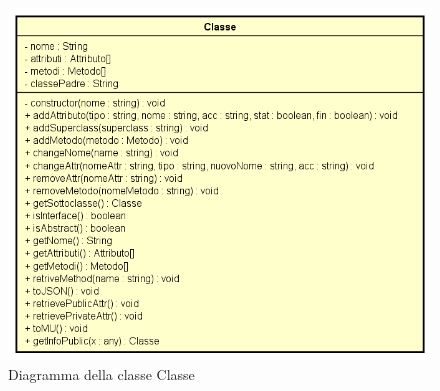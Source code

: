 \begin{figure}[h!]
	\centering
	\includegraphics[scale=0.8]{res/sections/SpecificaFrontEnd/Services/Disegnetti/classe.png}
	\caption{Diagramma della classe Classe}
\end{figure}

